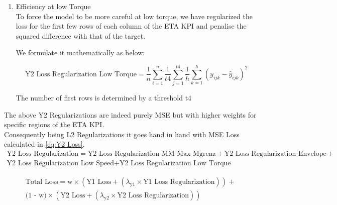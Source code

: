 \documentclass{report} %
\begin{document}
\begin{enumerate}
\item Efficiency at low Torque \\

To force the model to be more careful at low torque, we have regularized the loss for the first few rows of each column of the ETA \ac{KPI} and penalise the squared difference with that of the target.

We formulate it mathematically as below:

\begin{equation}
    \text{Y2 Loss Regularization Low Torque} = \frac{1}{n} \sum_{i=1}^{n} \frac{1}{t4} \sum_{j=1}^{t4} \frac{1}{h} \sum_{k=1}^{h} (y_{ijk} - \hat{y}_{ijk})^2
    \label{eq:Y2_Loss_Regularization_Low_Torque}
\end{equation}


\vspace{0.2cm} %

The number of first rows is determined by a threshold t4

\end{enumerate}

The above Y2 Regularizations are indeed purely \ac{MSE} but with higher weights for specific regions of the ETA \ac{KPI}.\\
Consequently being L2 Regularizations it goes hand in hand with \ac{MSE} Loss calculated in \ref{eq:Y2 Loss}.\\

\begin{equation}
    \begin{split}
\text{Y2 Loss Regularization} = \text{Y2 Loss Regularization MM Max Mgrenz} + \text{Y2 Loss Regularization Envelope} + \\
    \text{Y2 Loss Regularization Low Speed} + \text{Y2 Loss Regularization Low Torque}
    \end{split}
    \label{eq:Y2 Loss Regularization}
\end{equation}

\begin{equation}
    \begin{split}
\text{Total Loss} = \text{w} \times (\text{Y1 Loss} + (\lambda_{\text{y1}} \times \text{Y1 Loss Regularization})) +\\
 \text{(1 - w)} \times (\text{Y2 Loss} + (\lambda_{\text{y2}} \times \text{Y2 Loss Regularization}))
    \end{split}
    \label{eq:Total Loss}
\end{equation}
\end{document}
